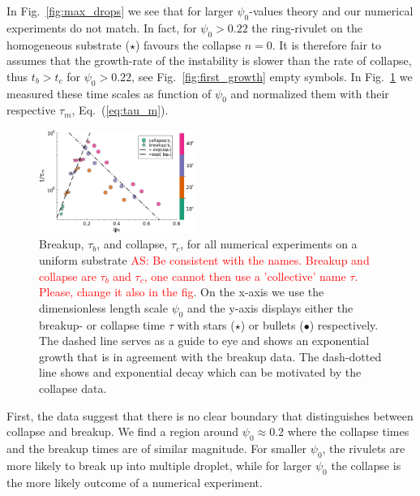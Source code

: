 \documentclass[twoside,twocolumn,9pt]{article}
\begin{document}
In Fig.~\ref{fig:max_drops} we see that for larger $\psi_0$-values theory and our numerical experiments do not match.
In fact, for $\psi_0 > 0.22$ the ring-rivulet on the homogeneous substrate (\textcolor{jlorange}{$\star$}) favours the collapse $n = 0$. 
It is therefore fair to assumes that the growth-rate of the instability is slower than the rate of collapse, thus $t_b > t_c$ for $\psi_0 > 0.22$, see Fig.~\ref{fig:first_growth} empty symbols.
In Fig.~\ref{fig:timescaleDifference} we measured these time scales as function of $\psi_0$ and normalized them with their respective $\tau_m$, Eq.~(\ref{eq:tau_m}).
\begin{figure}
    \centering
    \includegraphics[width = 0.45\textwidth]{assets/uniform_timescalesCC.pdf}
    \caption{Breakup, $\tau_b$, and collapse, $\tau_c$, for all numerical experiments on a uniform substrate \textcolor{red}{AS: Be consistent with the names. Breakup and collapse are $\tau_b$ and $\tau_c$, one cannot then use 
    a 'collective' name $\tau$. Please, change it also in the fig}.
        On the x-axis we use the dimensionless length scale $\psi_0$ and the y-axis displays either the breakup- or collapse time $\tau$ with stars (\textcolor{jlorange}{$\star$}) or bullets (\textcolor{jlblue}{$\bullet$}) respectively.
        The dashed line serves as a guide to eye and shows an exponential growth that is in agreement with the breakup data. 
        The dash-dotted line shows and exponential decay which can be motivated by the collapse data.
        }
    \label{fig:timescaleDifference}
\end{figure}
First, the data suggest that there is no clear boundary that distinguishes between collapse and breakup.
We find a region around $\psi_0 \approx 0.2$ where the collapse times and the breakup times are of similar magnitude.
For smaller $\psi_0$, the rivulets are more likely to break up into multiple droplet, while for larger $\psi_0$ the collapse is the more likely outcome of a numerical experiment.
\end{document}
